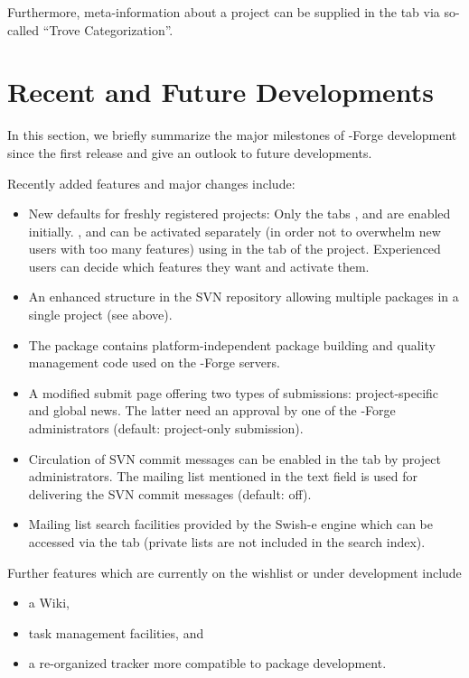 Furthermore, meta-information about a project can be supplied in
the  tab via so-called ``Trove Categorization''. 


\section*{Recent and Future Developments}

In this section, we briefly summarize the major milestones of
\R{}-Forge development since the first release and give an outlook to
future developments.

Recently added features and major changes include:

\begin{itemize}
\item New defaults for freshly registered projects: Only the tabs
  ,  and  are enabled
  initially. ,  and 
  can be activated separately (in order not to overwhelm
  new users with too many features) using  in
  the  tab of the project. Experienced users can decide
  which features they want and activate them.
\item An enhanced structure in the SVN repository allowing multiple
  packages in a single project (see above).
\item The \R{} package  \citep{forge:theussl:2008}
  contains platform-independent package
  building and quality management code used on the \R{}-Forge servers.
\item A modified  submit page offering two types of
  submissions: project-specific and global news. The latter
  need an approval by one of the \R{}-Forge administrators (default:
  project-only submission).
\item Circulation of SVN commit messages can be enabled in the
   tab by project administrators. The mailing list mentioned in
  the text field is used for delivering the SVN commit messages
  (default: off). 
\item Mailing list search facilities provided by the Swish-e engine
  which can be accessed via the  tab (private lists
  are not included in the search index).

\end{itemize}

Further features which are currently on the wishlist or under
development include 

\begin{itemize}
\item a Wiki,
\item task management facilities, and
\item a re-organized tracker more compatible to \R{} package development. 
\end{itemize}

